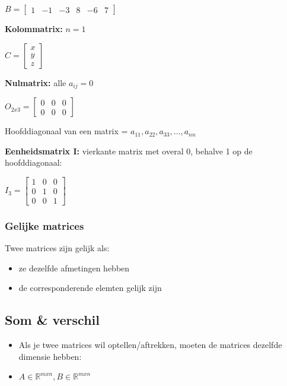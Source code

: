 \documentclass{article}
\begin{document}
$B = \begin{bmatrix}
1 & -1 & -3 & 8 & -6 & 7
\end{bmatrix}$


\textbf{Kolommatrix:} $n = 1$

$C = \begin{bmatrix}
x\\
y\\
z
\end{bmatrix}$

\textbf{Nulmatrix:} alle $a_{ij} = 0$ 

$O_{2x3} = \begin{bmatrix}
0 & 0 & 0\\
0 & 0 & 0
\end{bmatrix}$

Hoofddiagonaal van een matrix = $a_{11}, a_{22}, a_{33}, \dots, a_{nn}$

\textbf{Eenheidsmatrix I:} vierkante matrix met overal 0, behalve 1 op de hoofddiagonaal:

$I_3 = \begin{bmatrix}
1 & 0 & 0\\
0 & 1 & 0\\
0 & 0 & 1
\end{bmatrix}$

\subsubsection{Gelijke matrices}

Twee matrices zijn gelijk als:

\begin{itemize}
    \item ze dezelfde afmetingen hebben
    \item de corresponderende elemten gelijk zijn
\end{itemize}


\subsection{Som \& verschil}

\begin{itemize}
    \item Als je twee matrices wil optellen/aftrekken, moeten de matrices dezelfde dimensie hebben:
    \item $A \in \mathbb{R}^{mxn}, B \in \mathbb{R}^{mxn}$
\end{itemize}
\end{document}
